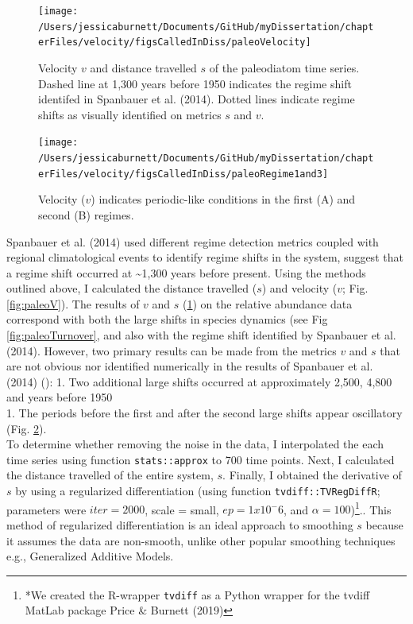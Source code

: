 \documentclass[12pt,twoside,openany]{reedthesis}
\begin{document}
\begin{figure}
\texttt{[image: /Users/jessicaburnett/Documents/GitHub/myDissertation/chapterFiles/velocity/figsCalledInDiss/paleoVelocity]} \caption{Velocity $v$ and distance travelled $s$ of the paleodiatom time series. Dashed line at 1,300 years before 1950 indicates the regime shift identifed in Spanbauer et al. (2014). Dotted lines indicate regime shifts as visually identified on metrics $s$ and $v$.}\label{fig:paleoVelocity}
\end{figure}
\begin{figure}
\texttt{[image: /Users/jessicaburnett/Documents/GitHub/myDissertation/chapterFiles/velocity/figsCalledInDiss/paleoRegime1and3]} \caption{Velocity ($v$) indicates periodic-like conditions in the first (A) and second (B) regimes.}\label{fig:paleoRegime1and3}
\end{figure}
Spanbauer et al. (2014) used different regime detection metrics coupled with regional climatological events to identify regime shifts in the system, suggest that a regime shift occurred at \textasciitilde1,300 years before present. Using the methods outlined above, I calculated the distance travelled (\(s\)) and velocity (\(v\); Fig. \ref{fig:paleoV}). The results of \(v\) and \(s\) (\ref{fig:paleoVelocity}) on the relative abundance data correspond with both the large shifts in species dynamics (see Fig \ref{fig:paleoTurnover}, and also with the regime shift identified by Spanbauer et al. (2014). However, two primary results can be made from the metrics \(v\) and \(s\) that are not obvious nor identified numerically in the results of Spanbauer et al. (2014) ():
1. Two additional large shifts occurred at approximately 2,500, 4,800 and years before 1950\\
1. The periods before the first and after the second large shifts appear oscillatory (Fig. \ref{fig:paleoRegime1and3}).\\
To determine whether removing the noise in the data, I interpolated the each time series using function \texttt{stats::approx} to 700 time points. Next, I calculated the distance travelled of the entire system, \(s\). Finally, I obtained the derivative of \(s\) by using a regularized differentiation (using function \texttt{tvdiff::TVRegDiffR}; parameters were \(iter = 2000\), scale = small, \(ep = 1 x 10^-6\), and \(\alpha = 100\))\footnote{*We created the R-wrapper \texttt{tvdiff} as a Python wrapper for the tvdiff MatLab package Price \& Burnett (2019)}.. This method of regularized differentiation is an ideal approach to smoothing \(s\) because it assumes the data are non-smooth, unlike other popular smoothing techniques e.g., Generalized Additive Models.
\end{document}
